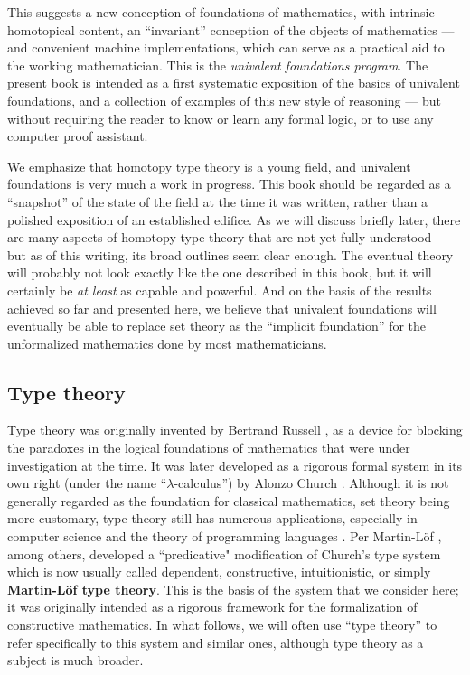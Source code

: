 This suggests a new conception of foundations of mathematics, with intrinsic homotopical content, an ``invariant'' conception of the objects of mathematics --- and convenient machine implementations, which can serve as a practical aid to the working mathematician.
This is the \emph{univalent foundations program}.
The present book is intended as a first systematic exposition of the basics of univalent foundations, and a collection of examples of this new style of reasoning --- but without requiring the reader to know or learn any formal logic, or to use any computer proof assistant.

We emphasize that homotopy type theory is a young field, and univalent foundations is very much a work in progress.
This book should be regarded as a ``snapshot'' of the state of the field at the time it was written, rather than a polished exposition of an established edifice.
As we will discuss briefly later, there are many aspects of homotopy type theory that are not yet fully understood --- but as of this writing, its broad outlines seem clear enough.
The eventual theory will probably not look exactly like the one described in this book, but it will certainly be \emph{at least} as capable and powerful.  And on the basis of the results achieved so far and presented here, we believe that univalent foundations will eventually be able to replace set theory as the ``implicit foundation'' for the unformalized mathematics done by most mathematicians.


\subsection*{Type theory}

Type theory was originally invented by Bertrand Russell \cite{Russell:1908}, as a device for blocking the paradoxes in the logical foundations of mathematics  that were under investigation at the time. It was later developed as a rigorous formal system  in its own right (under the name ``$\lambda$-calculus'') by Alonzo Church \cite{Church:1933cl,Church:1940tu,Church:1941tc}.  Although it is not generally regarded as the foundation for classical mathematics, set theory being more customary, type theory still has numerous applications, especially in computer science and the theory of programming languages \cite{Pierce:2002tp}.   Per Martin-L\"{o}f \cite{MartinLof:1998tw,MartinLof:1975tb,MartinLof:1982bn,MartinLof:1984tr}, among others,
developed a ``predicative" modification of Church's type system which is now usually called dependent, constructive, intuitionistic, or simply {\bf Martin\--L\"of type theory}. This is the basis of the system that we consider here; it was originally intended as a rigorous framework for the formalization of constructive mathematics.  In what follows, we will often use ``type theory'' to refer specifically to this system and similar ones, although type theory as a subject is much broader.

